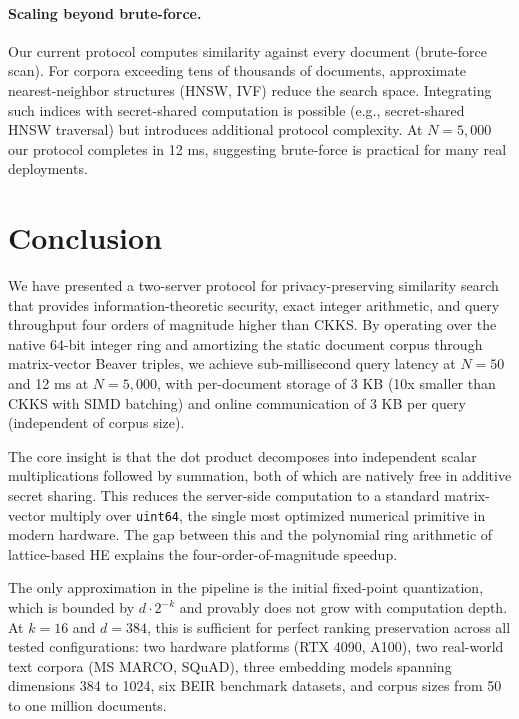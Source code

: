 \documentclass[11pt]{article}
\begin{document}
\paragraph{Scaling beyond brute-force.} Our current protocol computes similarity against every document (brute-force scan). For corpora exceeding tens of thousands of documents, approximate nearest-neighbor structures (HNSW, IVF) reduce the search space. Integrating such indices with secret-shared computation is possible (e.g., secret-shared HNSW traversal) but introduces additional protocol complexity. At $N = 5{,}000$ our protocol completes in 12 ms, suggesting brute-force is practical for many real deployments.


\section{Conclusion}
\label{sec:conclusion}

We have presented a two-server protocol for privacy-preserving similarity search that provides information-theoretic security, exact integer arithmetic, and query throughput four orders of magnitude higher than CKKS. By operating over the native 64-bit integer ring and amortizing the static document corpus through matrix-vector Beaver triples, we achieve sub-millisecond query latency at $N = 50$ and 12 ms at $N = 5{,}000$, with per-document storage of 3 KB (10x smaller than CKKS with SIMD batching) and online communication of 3 KB per query (independent of corpus size).

The core insight is that the dot product decomposes into independent scalar multiplications followed by summation, both of which are natively free in additive secret sharing. This reduces the server-side computation to a standard matrix-vector multiply over \texttt{uint64}, the single most optimized numerical primitive in modern hardware. The gap between this and the polynomial ring arithmetic of lattice-based HE explains the four-order-of-magnitude speedup.

The only approximation in the pipeline is the initial fixed-point quantization, which is bounded by $d \cdot 2^{-k}$ and provably does not grow with computation depth. At $k = 16$ and $d = 384$, this is sufficient for perfect ranking preservation across all tested configurations: two hardware platforms (RTX 4090, A100), two real-world text corpora (MS MARCO, SQuAD), three embedding models spanning dimensions 384 to 1024, six BEIR benchmark datasets, and corpus sizes from 50 to one million documents.




\end{document}
